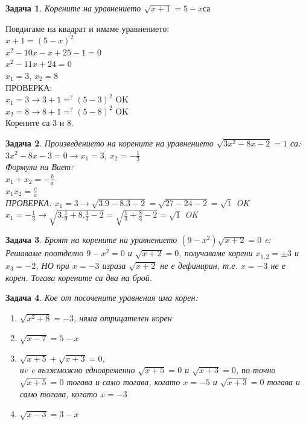 \documentclass{article}
\newtheorem{problem}{Задача}
\begin{document}
	\begin{problem}
		Корените на уравнението  $\sqrt {x +1} = 5-x са  $
	\end{problem}
	Повдигаме на квадрат и имаме уравнението: \\
	$x + 1 =  (5-x)^2 $ \\
	
	$x^2 -10x -x + 25 -1 = 0 $ \\
	$x^2 -11x + 24 = 0 $ \\
	$x_1 = 3 $, $x_2 = 8 $ \\
	
	ПРОВЕРКА:\\
	$x_1 = 3 \to 3+1 =^? (5-3)^2  $ OK \\
	$x_2 = 8 \to 8+1 =^? (5-8)^2 $ OK \\
	Корените са $3 $ и $8$.
	
	\begin{problem}
		Произведението на корените на уравнението $\sqrt{3x^2 - 8x - 2} = 1  $ са:  \\
		$3x^2 - 8x - 3 = 0 \to x_1 = 3$, $ x_2 = -\frac{1}{3} $ \\
		Формули на Виет: \\
		 $x_1 + x_2 = -\frac{b}{a}$  \\
		 $x_1x_2 = \frac{c}{a} $ \\
		 
		 ПРОВЕРКА:
		 $x_1 =3 \to \sqrt{3.9 - 8.3 -2} = \sqrt{27-24-2} = \sqrt{1} $ OK \\
		 
		 $x_1 =-\frac{1}{3} \to \sqrt{3.\frac{1}{9} + 8.\frac{1}{3}   -2} = \sqrt{\frac{1}{3} + \frac{8}{3} - 2} = \sqrt{1} $ OK
		 
	\end{problem}
	
	
	\begin{problem}
			Броят на корените на уравнението $(9-x^2
			)\sqrt{x+2} = 0$ e: \\
			Решаваме поотделно $9 - x^2 = 0 $ и $\sqrt{x+2} = 0 $, получаваме корени $x_{1,2} = \pm 3 $ и $x_3 = -2 $, НО при $ x = -3 $ израза $\sqrt{x+2} $ не е дефиниран, т.е. $x = -3 $ не е корен. Тогава корените са два на брой.
	\end{problem}
	
	\begin{problem}
		Кое от посочените уравнения има корен: 
	\begin{enumerate}
		\item $\sqrt{x^2 + 8} = -3   $, няма отрицателен корен
		\item $\sqrt{x-7} =  5 -x  $
		\item $\sqrt{x+5} + \sqrt{x+3} = 0 $, \\
		нe e възжможно едновременно $\sqrt{x+5} = 0$ и $ \sqrt{x+3} = 0 $, по-точно  $\sqrt{x+5} = 0$ тогава и само тогава, когато $x = -5 $ и $\sqrt{x+3} = 0$ тогава и само тогава, когато $x = -3 $
		\item $\sqrt{x-3} = 3-x $
	\end{enumerate}
	\end{problem}
\end{document}
